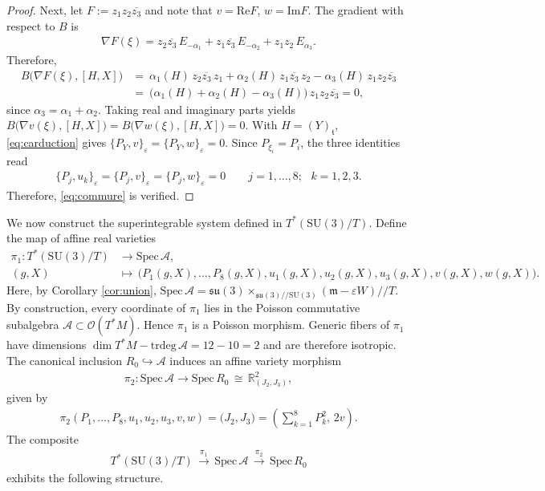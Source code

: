 \documentclass[11pt]{amsart}
\theoremstyle{definition}
\theoremstyle{plain}
\theoremstyle{conclusion}
\begin{document}
\begin{proof}
Next, let $F:=z_1z_2\overline{z_3}$ and note that $v=\mathrm{Re} F$, $w=\mathrm{Im} F$. The gradient with respect to $B$ is \begin{align*}
\nabla F(\xi)=z_2\overline{z_3}\,E_{-\alpha_1}+z_1\overline{z_3}\,E_{-\alpha_2}+z_1z_2\,E_{\alpha_3}.
\end{align*} Therefore, \begin{align*} 
B\big(\nabla F(\xi),[H,X]\big) &=\ \alpha_1(H)\,z_2\overline{z_3}\,z_1+\alpha_2(H)\,z_1\overline{z_3}\,z_2-\alpha_3(H)\,z_1z_2\overline{z_3}\\
&=\ \big(\alpha_1(H)+\alpha_2(H)-\alpha_3(H)\big)\,z_1z_2\overline{z_3}=0, 
\end{align*} since $\alpha_3=\alpha_1+\alpha_2$. Taking real and imaginary parts yields  $B\big(\nabla v(\xi),[H,X]\big)=B\big(\nabla w(\xi),[H,X]\big)=0$.  With $H=(Y)_{\mathfrak{t}}$, \eqref{eq:carduction} gives $\{P_Y,v\}_\varepsilon=\{P_Y,w\}_\varepsilon=0$. Since $P_{\xi_i}=P_i$, the three identities read \begin{align*}
\{P_j,u_k\}_\varepsilon=\{P_j,v\}_\varepsilon=\{P_j,w\}_\varepsilon=0\qquad j=1,\dots,8; \text{ }  k=1,2,3.
\end{align*} Therefore, \eqref{eq:commure} is verified.
 \end{proof}


 

We now construct the superintegrable system defined in $T^*(\mathrm{SU}(3)/T)$.  Define the map of affine real varieties 
\begin{align} 
\nonumber
\pi_1 : T^*(\mathrm{SU}(3)/T)&\longrightarrow\mathrm{Spec} \,\mathcal{A},\\
(g,X)\quad&\longmapsto\,
\bigl(P_1(g,X),\ldots ,P_8(g,X),u_1(g,X),u_2(g,X),u_3(g,X),v(g,X),w(g,X)\bigr).
\end{align} Here, by Corollary \eqref{cor:union}, $\mathrm{Spec} \, \mathcal{A} = \mathfrak{su}(3) \times_{\mathfrak{su}(3)//\mathrm{SU}(3)} (\mathfrak{m} - \varepsilon W)//T$. By construction, every coordinate of $\pi_1$ lies in the Poisson commutative subalgebra $\mathcal{A} \subset \mathcal{O}(T^*M)$. Hence $\pi_1$ is a Poisson morphism.  Generic fibers of $\pi_1$ have dimensions $\dim T^*M-\mathrm{trdeg} \, \mathcal{A}=12-10=2$ and are therefore isotropic.   The canonical inclusion $R_0\hookrightarrow \mathcal{A}$ induces an affine variety morphism \begin{align*}
\pi_2:\mathrm{Spec} \,\mathcal{A}\longrightarrow\mathrm{Spec} \, R_0
          \,\cong\,\mathbb{R}^2_{(J_2,J_3)}, 
  \end{align*} given by \begin{align}
     \pi_2(P_1,\ldots ,P_8,u_1,u_2,u_3,v,w)    =  \bigl(J_2,J_3\bigr)    =\left(\sum_{k=1}^8P_k^2,\,2v\right). 
  \end{align} The composite \begin{align*}
      T^*(\mathrm{SU}(3)/T)\,\xrightarrow{\,\pi_1\,}\,\mathrm{Spec} \,\mathcal{A}
        \,\xrightarrow{\,\pi_2\,}\,\mathrm{Spec} \, R_0
  \end{align*}  exhibits the following structure.
  
\end{document}
